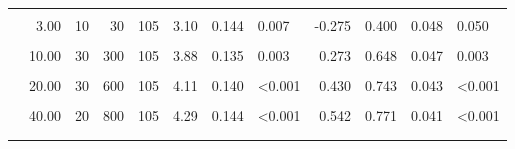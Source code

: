 \documentclass[
]{article}
\begin{document}
\begin{longtable}[t]{lrrrrrrlrrrl}
\hspace{1em}\cellcolor{gray!10}{} & \cellcolor{gray!10}{2.00} & \cellcolor{gray!10}{200} & \cellcolor{gray!10}{400} & \cellcolor{gray!10}{105} & \cellcolor{gray!10}{3.04} & \cellcolor{gray!10}{0.132} & \cellcolor{gray!10}{0.002} & \cellcolor{gray!10}{-0.342} & \cellcolor{gray!10}{0.390} & \cellcolor{gray!10}{0.048} & \cellcolor{gray!10}{0.031}\\
\hspace{1em} & 3.00 & 10 & 30 & 105 & 3.10 & 0.144 & 0.007 & -0.275 & 0.400 & 0.048 & 0.050\\
\hspace{1em}\cellcolor{gray!10}{} & \cellcolor{gray!10}{4.00} & \cellcolor{gray!10}{100} & \cellcolor{gray!10}{400} & \cellcolor{gray!10}{105} & \cellcolor{gray!10}{3.48} & \cellcolor{gray!10}{0.145} & \cellcolor{gray!10}{0.931} & \cellcolor{gray!10}{-0.016} & \cellcolor{gray!10}{0.533} & \cellcolor{gray!10}{0.049} & \cellcolor{gray!10}{0.558}\\
\hspace{1em} & 10.00 & 30 & 300 & 105 & 3.88 & 0.135 & 0.003 & 0.273 & 0.648 & 0.047 & 0.003\\
\hspace{1em}\cellcolor{gray!10}{} & \cellcolor{gray!10}{15.00} & \cellcolor{gray!10}{400} & \cellcolor{gray!10}{6000} & \cellcolor{gray!10}{105} & \cellcolor{gray!10}{4.01} & \cellcolor{gray!10}{0.145} & \cellcolor{gray!10}{<0.001} & \cellcolor{gray!10}{0.345} & \cellcolor{gray!10}{0.695} & \cellcolor{gray!10}{0.045} & \cellcolor{gray!10}{<0.001}\\
\hspace{1em} & 20.00 & 30 & 600 & 105 & 4.11 & 0.140 & <0.001 & 0.430 & 0.743 & 0.043 & <0.001\\
\hspace{1em}\cellcolor{gray!10}{} & \cellcolor{gray!10}{30.00} & \cellcolor{gray!10}{400} & \cellcolor{gray!10}{12000} & \cellcolor{gray!10}{105} & \cellcolor{gray!10}{4.09} & \cellcolor{gray!10}{0.149} & \cellcolor{gray!10}{<0.001} & \cellcolor{gray!10}{0.385} & \cellcolor{gray!10}{0.714} & \cellcolor{gray!10}{0.045} & \cellcolor{gray!10}{<0.001}\\
\hspace{1em} & 40.00 & 20 & 800 & 105 & 4.29 & 0.144 & <0.001 & 0.542 & 0.771 & 0.041 & <0.001\\
\addlinespace[0.3em]
\multicolumn{12}{l}{\textbf{Exp. 2}}\\
\hspace{1em}\cellcolor{gray!10}{economic} & \cellcolor{gray!10}{1.33} & \cellcolor{gray!10}{300} & \cellcolor{gray!10}{400} & \cellcolor{gray!10}{101} & \cellcolor{gray!10}{4.07} & \cellcolor{gray!10}{0.176} & \cellcolor{gray!10}{0.002} & \cellcolor{gray!10}{0.323} & \cellcolor{gray!10}{0.653} & \cellcolor{gray!10}{0.048} & \cellcolor{gray!10}{0.003}\\

\end{longtable}
\end{document}
